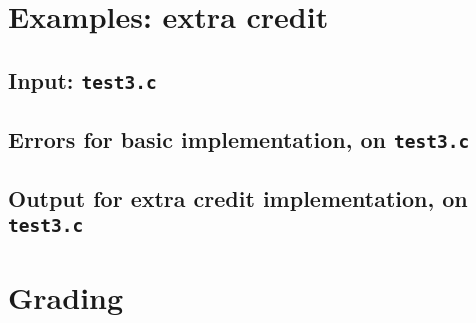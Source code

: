 \documentclass{article}
\begin{document}


\section{Examples: extra credit} \label{SEC:exmax}

\subsection{Input: {\tt test3.c}}



\subsection{Errors for basic implementation, on {\tt test3.c}}



\subsection{Output for extra credit implementation, on {\tt test3.c}}



\section{Grading}
\end{document}
